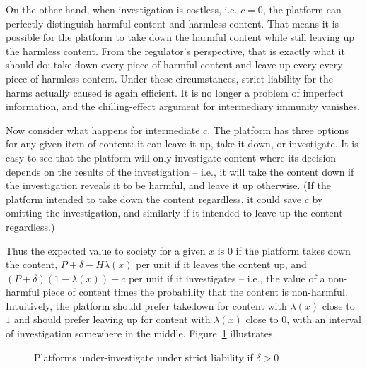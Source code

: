 On the other hand, when investigation is costless, i.e. $c = 0$, the platform can  perfectly distinguish harmful content and harmless content. That means it is possible for the platform to take down the harmful content while still leaving up the harmless content. From the regulator's perspective, that is exactly what it should do: take down every piece of harmful content and leave up every every piece of harmless content. Under these circumstances, strict liability for the harms actually caused is again efficient. It is no longer a problem of imperfect information, and the chilling-effect argument for intermediary immunity vanishes.

Now consider what happens for intermediate $c$. The platform has three options for any given item of content: it can leave it up, take it down, or investigate. It is easy to see that the platform will only investigate content where its decision depends on the results of the investigation -- i.e.,  it will take the content down if the investigation reveals it to be harmful, and leave it up otherwise. (If the platform intended to take down the content regardless, it could save $c$ by omitting the investigation, and similarly if it intended to leave up the content regardless.)

Thus the expected value to society for a given $x$ is $0$ if the platform takes down the content, $P + \delta - H\lambda(x)$ per unit if it leaves the content up, and $(P + \delta)(1 - \lambda(x)) - c$ per unit if it investigates -- i.e., the value of a non-harmful piece of content times the probability that the content is non-harmful. Intuitively, the platform should prefer takedown for content with $\lambda(x)$ close to $1$ and should prefer leaving up for content with $\lambda(x)$ close to $0$, with an interval of investigation somewhere in the middle. Figure~\ref{fig:investigation} illustrates.

\begin{figure}[h]
    \centering
{}
    \caption{Platforms under-investigate under strict liability if $\delta>0$}
    \label{fig:investigation}
\end{figure}

